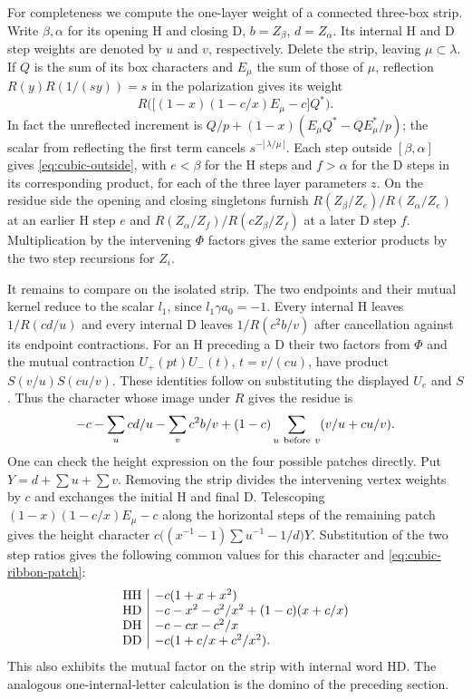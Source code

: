 For completeness we compute the one-layer weight of a connected
three-box strip. Write $\beta,\alpha$ for its opening H and closing
D, $b=Z_\beta$, $d=Z_\alpha$. Its internal H and D step weights are
denoted by $u$ and $v$, respectively. Delete the strip, leaving
$\mu\subset\lambda$. If $Q$ is the sum of its box characters and
$E_\mu$ the sum of those of $\mu$, reflection
$R(y)R(1/(sy))=s$ in the polarization gives its weight
\[
 R\big(\big[(1-x)(1-c/x)E_\mu-c\big]Q^*\big).
\]
In fact the unreflected increment is
$Q/p+(1-x)(E_\mu Q^*-QE_\mu^*/p)$; the scalar from
reflecting the first term cancels $s^{-|\,\lambda/\mu\,|}$.
Each step outside $[\beta,\alpha]$ gives
\eqref{eq:cubic-outside}, with $e<\beta$ for the H steps and $f>\alpha$ for the D steps in its
corresponding product, for each of the three layer parameters $z$.
On the residue side the opening and closing singletons furnish
$R(Z_\beta/Z_e)/R(Z_\alpha/Z_e)$ at an earlier H step $e$ and
$R(Z_\alpha/Z_f)/R(cZ_\beta/Z_f)$ at a later D step $f$.
Multiplication by the intervening $\Phi$ factors gives the same
exterior products by the two step recursions for $Z_i$.

It remains to compare on the isolated strip. The two endpoints and
their mutual kernel reduce to the scalar $l_1$, since
$l_1\gamma a_0=-1$. Every internal H leaves $1/R(cd/u)$ and every
internal D leaves $1/R(c^2 b/v)$ after cancellation against its
endpoint contractions. For an H preceding a D their two factors
from $\Phi$ and the mutual contraction $U_+(pt)U_-(t)$,
$t=v/(cu)$, have product $S(v/u)S(cu/v)$. These identities follow
on substituting the displayed $U_e$ and $S$. Thus the character
whose image under $R$ gives the residue is
\begin{equation}\label{eq:cubic-ribbon-patch}
 -c-\sum_u cd/u-\sum_v c^2b/v+
       (1-c)\sum_{u\ {\rm before}\ v}(v/u+cu/v).
\end{equation}
One can check the height expression on the four possible patches
directly. Put $Y=d+\sum u+\sum v$. Removing the strip divides the
intervening vertex weights by $c$ and exchanges the initial H and
final D. Telescoping $(1-x)(1-c/x)E_\mu-c$ along the horizontal
steps of the remaining patch gives the height character
$c\big((x^{-1}-1)\sum u^{-1}-1/d\big)Y$.
Substitution of the two step ratios gives the following common
values for this character and \eqref{eq:cubic-ribbon-patch}:
\[
\begin{array}{c|l}
 {\rm HH}&-c(1+x+x^2)\\
 {\rm HD}&-c-x^2-c^2/x^2+(1-c)(x+c/x)\\
 {\rm DH}&-c-cx-c^2/x\\
 {\rm DD}&-c(1+c/x+c^2/x^2).
\end{array}
\]
This also exhibits the mutual factor on the strip with internal
word HD. The analogous one-internal-letter calculation is the
domino of the preceding section.


